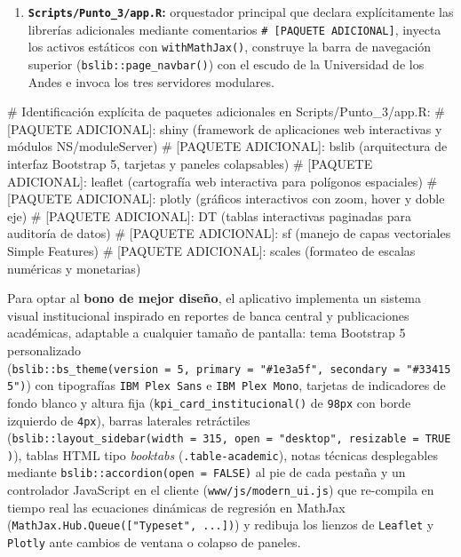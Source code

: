 \documentclass[
  10pt,
  letterpaper,
  DIV=11,
  numbers=noendperiod]{scrartcl}
\newenvironment{Shaded}{\begin{snugshade}}{\end{snugshade}}
\newcommand{\CommentTok}[1]{\textcolor[rgb]{0.37,0.37,0.37}{#1}}
\begin{document}
\begin{enumerate}
  \texttt{.card-equal-height} y \emph{media queries} responsivas;
  \texttt{js/modern\_ui.js} con re-renderizado dinámico de ecuaciones
  MathJax en \texttt{shiny:value} y redimensionamiento automático de
  widgets; e \texttt{img/logo\_uniandes.png} recortado
  programáticamente).
\item
  \textbf{\texttt{Scripts/Punto\_3/app.R}:} orquestador principal que
  declara explícitamente las librerías adicionales mediante comentarios
  \texttt{\#\ {[}PAQUETE\ ADICIONAL{]}}, inyecta los activos estáticos
  con \texttt{withMathJax()}, construye la barra de navegación superior
  (\texttt{bslib::page\_navbar()}) con el escudo de la Universidad de
  los Andes e invoca los tres servidores modulares.
\end{enumerate}

\begin{Shaded}
\begin{Highlighting}[]
\CommentTok{\# Identificación explícita de paquetes adicionales en Scripts/Punto\_3/app.R:}
\CommentTok{\# [PAQUETE ADICIONAL]: shiny (framework de aplicaciones web interactivas y módulos NS/moduleServer)}
\CommentTok{\# [PAQUETE ADICIONAL]: bslib (arquitectura de interfaz Bootstrap 5, tarjetas y paneles colapsables)}
\CommentTok{\# [PAQUETE ADICIONAL]: leaflet (cartografía web interactiva para polígonos espaciales)}
\CommentTok{\# [PAQUETE ADICIONAL]: plotly (gráficos interactivos con zoom, hover y doble eje)}
\CommentTok{\# [PAQUETE ADICIONAL]: DT (tablas interactivas paginadas para auditoría de datos)}
\CommentTok{\# [PAQUETE ADICIONAL]: sf (manejo de capas vectoriales Simple Features)}
\CommentTok{\# [PAQUETE ADICIONAL]: scales (formateo de escalas numéricas y monetarias)}
\end{Highlighting}
\end{Shaded}

Para optar al \textbf{bono de mejor diseño}, el aplicativo implementa un
sistema visual institucional inspirado en reportes de banca central y
publicaciones académicas, adaptable a cualquier tamaño de pantalla: tema
Bootstrap 5 personalizado
(\texttt{bslib::bs\_theme(version\ =\ 5,\ primary\ =\ "\#1e3a5f",\ secondary\ =\ "\#334155")})
con tipografías \texttt{IBM\ Plex\ Sans} e \texttt{IBM\ Plex\ Mono},
tarjetas de indicadores de fondo blanco y altura fija
(\texttt{kpi\_card\_institucional()} de \texttt{98px} con borde
izquierdo de \texttt{4px}), barras laterales retráctiles
(\texttt{bslib::layout\_sidebar(width\ =\ 315,\ open\ =\ "desktop",\ resizable\ =\ TRUE)}),
tablas HTML tipo \emph{booktabs} (\texttt{.table-academic}), notas
técnicas desplegables mediante \texttt{bslib::accordion(open\ =\ FALSE)}
al pie de cada pestaña y un controlador JavaScript en el cliente
(\texttt{www/js/modern\_ui.js}) que re-compila en tiempo real las
ecuaciones dinámicas de regresión en MathJax
(\texttt{MathJax.Hub.Queue({[}"Typeset",\ ...{]})}) y redibuja los
lienzos de \texttt{Leaflet} y \texttt{Plotly} ante cambios de ventana o
colapso de paneles.
\end{document}
